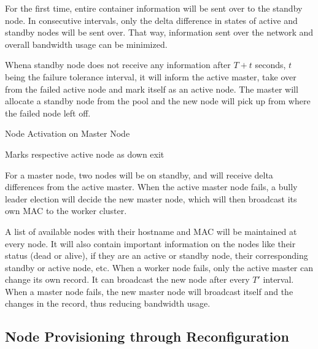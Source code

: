\documentclass[conference]{IEEEtran}
\begin{document}
For the first time, entire container information will be sent over to the standby node. In consecutive intervals, only the delta difference in states of active and standby nodes will be sent over. That way, information sent over the network and overall bandwidth usage can be minimized.

Whena standby node does not receive any information after $T + t$ seconds, $t$ being the failure tolerance interval, it will inform the active master, take over from the failed active node and mark itself as an active node. The master will allocate a standby node from the pool and the new node will pick up from where the failed node left off.

\begin{algorithm}
    \caption{Node Activation on Master Node}
    \begin{algorithmic}[1]
            \LineComment Marks respective active node as down
                    \State exit
                \EndIf
            \EndFor
        \EndFunction
    \end{algorithmic}
\end{algorithm}

For a master node, two nodes will be on standby, and will receive delta differences from the active master. When the active master node fails, a bully leader election will decide the new master node, which will then broadcast its own MAC to the worker cluster.

A list of available nodes with their hostname and MAC will be maintained at every node. It will also contain important information on the nodes like their status (dead or alive), if they are an active or standby node, their corresponding standby or active node, etc. When a worker node fails, only the active master can change its own record. It can broadcast the new node after every $T'$ interval. When a master node fails, the new master node will broadcast itself and the changes in the record, thus reducing bandwidth usage.

\subsection{Node Provisioning through Reconfiguration}
\end{document}
